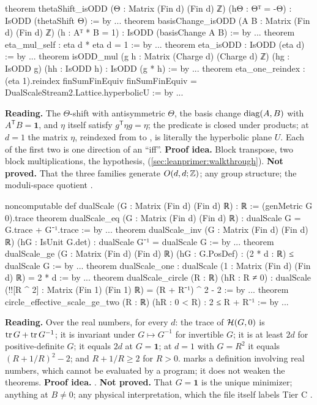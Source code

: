 \begin{leanbox}
\begin{leancode}
theorem thetaShift_isODD (Θ : Matrix (Fin d) (Fin d) ℤ) (hΘ : Θᵀ = -Θ) :
    IsODD (thetaShift Θ) := by ...
theorem basisChange_isODD (A B : Matrix (Fin d) (Fin d) ℤ) (h : Aᵀ * B = 1) :
    IsODD (basisChange A B) := by ...
theorem eta_mul_self : eta d * eta d = 1 := by ...
theorem eta_isODD : IsODD (eta d) := by ...
theorem isODD_mul (g h : Matrix (Charge d) (Charge d) ℤ) (hg : IsODD g)
    (hh : IsODD h) : IsODD (g * h) := by ...
theorem eta_one_reindex :
    (eta 1).reindex finSumFinEquiv finSumFinEquiv
      = DualScaleStream2.Lattice.hyperbolicU := by ...
\end{leancode}
\textbf{Reading.} The $\Theta$-shift with antisymmetric $\Theta$, the basis change
$\operatorname{diag}(A,B)$ with $A^{\mathsf T}B=\mathbf 1$, and $\eta$ itself satisfy
$g^{\mathsf T}\eta g=\eta$; the predicate is closed under products; at $d=1$ the matrix
$\eta$, reindexed from  to , is literally the hyperbolic
plane $U$. Each of the first two is one direction of an ``iff''. \textbf{Proof idea.}
Block transpose, two block multiplications, the hypothesis, 
(\cref{sec:leanprimer:walkthrough}). \textbf{Not proved.} That the three families generate
$O(d,d;\mathbb{Z})$; any group structure; the moduli-space quotient
. \TA
\end{leanbox}

\begin{leanbox}
\begin{leancode}
noncomputable def dualScale (G : Matrix (Fin d) (Fin d) ℝ) : ℝ :=
  (genMetric G 0).trace
theorem dualScale_eq (G : Matrix (Fin d) (Fin d) ℝ) :
    dualScale G = G.trace + G⁻¹.trace := by ...
theorem dualScale_inv (G : Matrix (Fin d) (Fin d) ℝ) (hG : IsUnit G.det) :
    dualScale G⁻¹ = dualScale G := by ...
theorem dualScale_ge (G : Matrix (Fin d) (Fin d) ℝ) (hG : G.PosDef) :
    (2 * d : ℝ) ≤ dualScale G := by ...
theorem dualScale_one :
    dualScale (1 : Matrix (Fin d) (Fin d) ℝ) = 2 * d := by ...
theorem dualScale_circle (R : ℝ) (hR : R ≠ 0) :
    dualScale (!![R ^ 2] : Matrix (Fin 1) (Fin 1) ℝ)
      = (R + R⁻¹) ^ 2 - 2 := by ...
theorem circle_effective_scale_ge_two (R : ℝ) (hR : 0 < R) :
    2 ≤ R + R⁻¹ := by ...
\end{leancode}
\textbf{Reading.} Over the real numbers, for every $d$: the trace of $\mathcal{H}(G,0)$ is
$\operatorname{tr} G+\operatorname{tr} G^{-1}$; it is invariant under $G\mapsto G^{-1}$ for invertible $G$; it is at
least $2d$ for positive-definite $G$; it equals $2d$ at $G=\mathbf 1$; at $d=1$ with
$G=R^2$ it equals $(R+1/R)^2-2$; and $R+1/R\ge2$ for $R>0$.  marks a
definition involving real numbers, which cannot be evaluated by a program; it does not
weaken the theorems. \textbf{Proof idea.} . \textbf{Not
proved.} That $G=\mathbf 1$ is the unique minimizer; anything at $B\neq0$; any physical
interpretation, which the file itself labels Tier C
. \TA
\end{leanbox}

